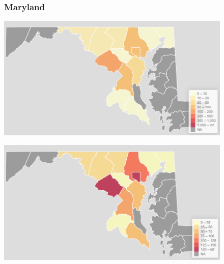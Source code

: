 \documentclass[11pt]{article}
\begin{document}
\begin{landscape}
\begin{figure}[h]
\subsubsection*{Maryland}
\vfill
\hspace*{-3cm}
\begin{minipage}{.8\textwidth}
    \includegraphics[width=.95\textwidth]{ImageResults/MarylandTotal.PNG}
\end{minipage}%
\begin{minipage}{.8\textwidth}
    \includegraphics[width=.95\textwidth]{ImageResults/Maryland100k.PNG}
    \label{fig:Mary100k}
\end{minipage}
\fillandplacepagenumber
\end{figure}
\end{landscape}
\end{document}
